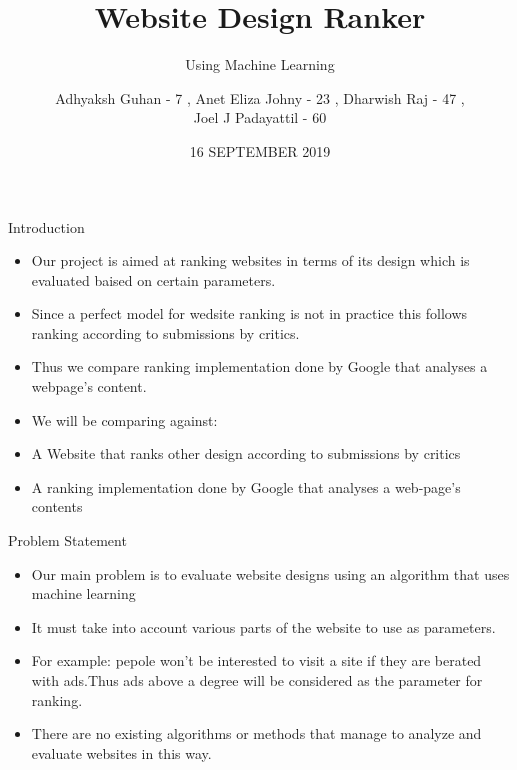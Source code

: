 \documentclass[11pt]{beamer}
\begin{document}
	\title{\textbf{Website Design Ranker}}
	\subtitle{Using Machine Learning}
	\date{16 SEPTEMBER 2019}
	\author{{\scriptsize Adhyaksh Guhan - 7 , Anet Eliza Johny - 23 , Dharwish Raj - 47 , \\ Joel J Padayattil - 60}}
	\begin{frame}[plain]
		\maketitle
	\end{frame}
	\begin{frame}{Introduction}
		\begin{itemize}
			
			
			\item Our project is aimed at ranking websites in terms of its design which is evaluated baised on certain parameters.
			
			\item Since a perfect model for wedsite ranking  is not in practice this  follows ranking according to submissions by critics.
			
			\item Thus we compare ranking implementation done by Google that analyses a webpage's content.
		
			\item We will be comparing against:
				\item A Website that ranks other design according to submissions by critics
				\item A ranking implementation done by Google that analyses a web-page's contents
		\end{itemize}
	\end{frame}
	\begin{frame}{Problem Statement}
		\begin{itemize}

			\item Our main problem is to evaluate website designs using an algorithm that uses machine learning
			
			\item It must take into account various parts of the website to use as parameters.
			
			\item For example: pepole won't be interested to visit a site if they are berated with ads.Thus ads above a degree will be considered as the parameter for ranking.

			\item There are no existing algorithms or methods that manage to analyze and evaluate websites in this way.
		\end{itemize}
	\end{frame}
\end{document}
